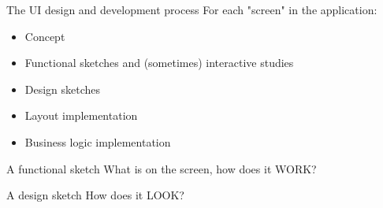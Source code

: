 \documentclass[aspectratio=43,handout,bigger]{beamer}
\begin{document}

\begin{frame}{The UI design and development process}
  For each "screen" in the application:

  \begin{itemize}
    \item Concept
    \item Functional sketches and (sometimes) interactive studies
    \item Design sketches
    \item Layout implementation
    \item Business logic implementation
  \end{itemize}
\end{frame}


\begin{frame}{A functional sketch}
  What is on the screen, how does it WORK?

\end{frame}


\begin{frame}{A design sketch}
  How does it LOOK?

\end{frame}
\end{document}
